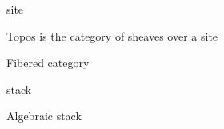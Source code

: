 \documentclass[main]{subfiles}
\begin{document}
\begin{definition}
site
\end{definition}

\begin{definition}
Topos is the category of sheaves over a site
\end{definition}

\begin{definition}
Fibered category
\end{definition}

\begin{definition}
stack
\end{definition}

\begin{definition}
Algebraic stack
\end{definition}
\end{document}
